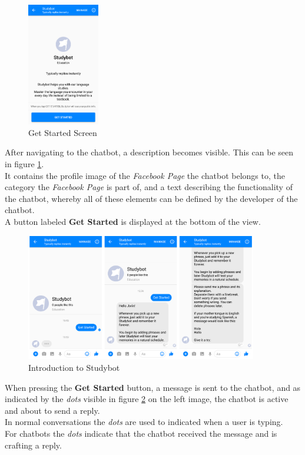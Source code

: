 \begin{figure}
  \centering
  \includegraphics[width=0.28\textwidth]{images/interface/02-getstarted.png}
	\caption{Get Started Screen}
	\label{fig:02-getstarted}
\end{figure}

After navigating to the chatbot,
a description becomes visible.
This can be seen in figure \ref{fig:02-getstarted}.
\\
It contains the profile image of the \emph{Facebook Page} the chatbot belongs to,
the category the \emph{Facebook Page} is part of,
and a text describing the functionality of the chatbot,
whereby all of these elements can be defined by the developer of the chatbot.
\\
A button labeled \textbf{Get Started} is displayed at the bottom of the view.
\\

\begin{figure}[h]
  \centering
  \includegraphics[width=0.9\textwidth]{images/interface/03-welcome.png}
	\caption{Introduction to Studybot}
	\label{fig:03-welcome}
\end{figure}

When pressing the \textbf{Get Started} button, a message is sent to the chatbot,
and as indicated by the \emph{dots} visible in figure \ref{fig:03-welcome} on the left image,
the chatbot is active and about to send a reply.
\\
In normal conversations the \emph{dots} are used to indicated when a user is typing.
\\
For chatbots the \emph{dots} indicate that the chatbot received the message and is crafting a reply.
\\

